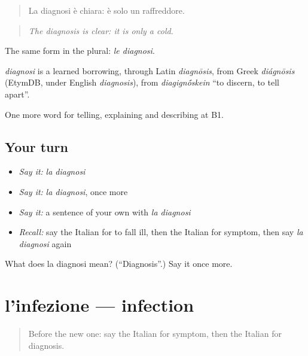 \begin{quote}
La diagnosi è chiara: è solo un raffreddore.
\end{quote}

\begin{quote}
\emph{The diagnosis is clear: it is only a cold.}
\end{quote}

The same form in the plural: \emph{le diagnosi}.

\begin{cousinweb}
\emph{diagnosi} is a learned borrowing, through Latin \emph{diagnōsis}, from Greek \emph{diágnōsis} (EtymDB, under English \emph{diagnosis}), from \emph{diagign\'{\={o}}skein} \textquotedblleft{}to discern, to tell apart\textquotedblright{}.
\end{cousinweb}

\begin{grammarlens}[title={What you've built}]
One more word for telling, explaining and describing at B1.
\end{grammarlens}

\subsection*{Your turn}
\begin{itemize}
\raggedright
  \item \emph{Say it:} \emph{la diagnosi}
  \item \emph{Say it:} \emph{la diagnosi}, once more
  \item \emph{Say it:} a sentence of your own with \emph{la diagnosi}
  \item \emph{Recall:} say the Italian for to fall ill, then the Italian for symptom, then say \emph{la diagnosi} again
\end{itemize}

\begin{tcolorbox}[breakable,colback=teal!4,colframe=teal!35!black,title={Before you move on}]
What does la diagnosi mean? (\textquotedblleft{}Diagnosis\textquotedblright{}.) Say it once more.
\end{tcolorbox}
\section[l'infezione]{l'infezione — infection}

\label{lesson:IT-C489-infezione}



\begin{quote}
Before the new one: say the Italian for symptom, then the Italian for diagnosis.
\end{quote}

